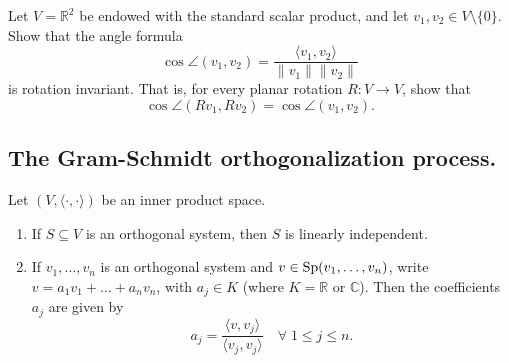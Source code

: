 \begin{exercise}
  \label{exc:rotation_invariance_angle}
  Let $V = \mathbb{R}^2$ be endowed with the standard scalar product, and let $v_1, v_2 \in V \setminus \{0\}$. Show that the angle formula
  \[
  \cos \angle(v_1, v_2) = \frac{\langle v_1, v_2 \rangle}{\|v_1\| \|v_2\|}
  \]
  is rotation invariant. That is, for every planar rotation $R: V \to V$, show that
  \[
  \cos \angle(R v_1, R v_2) = \cos \angle(v_1, v_2).
  \]
\end{exercise}

\subsection*{The Gram-Schmidt orthogonalization process.}

\begin{theorem}
\label{thm:properties_orthogonal_systems}
    Let $(V, \langle \cdot, \cdot \rangle)$ be an inner product space.
    \begin{enumerate}[label=\textbf{(\alph*)}]
        \item If $S \subseteq V$ is an orthogonal system, then $S$ is linearly independent.
        \item If $v_1, \dots, v_n$ is an orthogonal system and $v \in \operatorname{Sp}(v_1, \dots, v_n)$, write $v = a_1 v_1 + \dots + a_n v_n$, with $a_j \in K$ (where $K = \mathbb{R}$ or $\mathbb{C}$). Then the coefficients $a_j$ are given by 
        \[
            a_j = \frac{\langle v, v_j \rangle}{\langle v_j, v_j \rangle} \quad \forall \; 1 \leq j \leq n.
        \]
    \end{enumerate}
\end{theorem}

